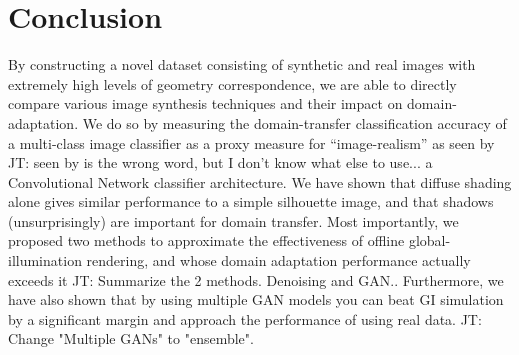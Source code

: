 \documentclass[10pt,twocolumn,letterpaper]{article}
\newcommand{\tompson}[1]{{\color{green} JT: #1}}
\begin{document}
\section{Conclusion}

By constructing a novel dataset consisting of synthetic and real images with extremely high levels of geometry correspondence, we are able to directly compare various image synthesis techniques and their impact on domain-adaptation. We do so by measuring the domain-transfer classification accuracy of a multi-class image classifier as a proxy measure for ``image-realism'' as seen by \tompson{seen by is the wrong word, but I don't know what else to use...} a Convolutional Network classifier architecture.  We have shown that diffuse shading alone gives similar performance to a simple silhouette image, and that shadows (unsurprisingly) are important for domain transfer.  Most importantly, we proposed two methods to approximate the effectiveness of offline global-illumination rendering, and whose domain adaptation performance actually exceeds it \tompson{Summarize the 2 methods. Denoising and GAN.}. Furthermore, we have also shown that by using multiple GAN models you can beat GI simulation by a significant margin and approach the performance of using real data. \tompson{Change "Multiple GANs" to "ensemble".}

\end{document}
